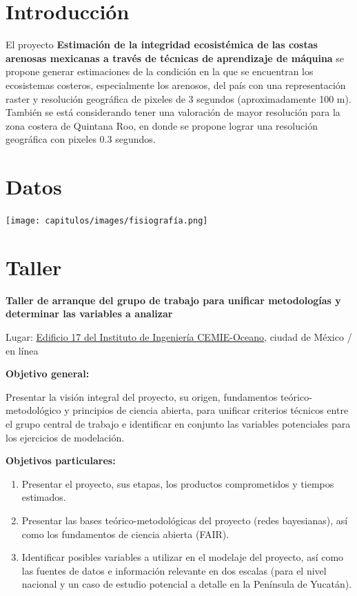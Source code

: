 \documentclass[
  letterpaper,
  DIV=11,
  numbers=noendperiod]{scrreprt}
\providecommand{\tightlist}{%
  \setlength{\itemsep}{0pt}\setlength{\parskip}{0pt}}\usepackage{longtable,booktabs,array}
\begin{document}

\chapter{Introducción}\label{introducciuxf3n}

El proyecto \textbf{Estimación de la integridad ecosistémica de las
costas arenosas mexicanas a través de técnicas de aprendizaje de
máquina} se propone generar estimaciones de la condición en la que se
encuentran los ecosistemas costeros, especialmente los arenosos, del
país con una representación raster y resolución geográfica de pixeles de
3 segundos (aproximadamente 100 m). También se está considerando tener
una valoración de mayor resolución para la zona costera de Quintana Roo,
en donde se propone lograr una resolución geográfica con pixeles 0.3
segundos.


\chapter{Datos}\label{datos}

\texttt{[image: capitulos/images/fisiografía.png]}


\chapter{Taller}\label{taller}

\textbf{Taller de arranque del grupo de trabajo para unificar
metodologías y determinar las variables a analizar}

Lugar: \href{https://maps.app.goo.gl/hCVkgx3S4XdrRimm7}{Edificio 17 del
Instituto de Ingeniería CEMIE-Oceano}, ciudad de México / en línea

\textbf{Objetivo general:}

Presentar la visión integral del proyecto, su origen, fundamentos
teórico-metodológico y principios de ciencia abierta, para unificar
criterios técnicos entre el grupo central de trabajo e identificar en
conjunto las variables potenciales para los ejercicios de modelación.

\textbf{Objetivos particulares:}

\begin{enumerate}
\def\labelenumi{\arabic{enumi}.}
\tightlist
\item
  Presentar el proyecto, sus etapas, los productos comprometidos y
  tiempos estimados.
\item
  Presentar las bases teórico-metodológicas del proyecto (redes
  bayesianas), así como los fundamentos de ciencia abierta (FAIR).
\item
  Identificar posibles variables a utilizar en el modelaje del proyecto,
  así como las fuentes de datos e información relevante en dos escalas
  (para el nivel nacional y un caso de estudio potencial a detalle en la
  Península de Yucatán).
\end{enumerate}
\end{document}
